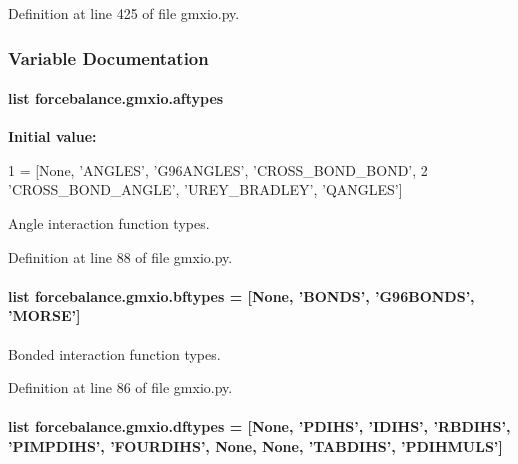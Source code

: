 Definition at line 425 of file gmxio.\-py.



\subsubsection{Variable Documentation}
\hypertarget{namespaceforcebalance_1_1gmxio_aef89ff391902f81feb14e28ec301296c}{
\paragraph[{aftypes}]{\setlength{\rightskip}{0pt plus 5cm}list forcebalance.\-gmxio.\-aftypes}}\label{namespaceforcebalance_1_1gmxio_aef89ff391902f81feb14e28ec301296c}
{\bfseries Initial value\-:}
\begin{DoxyCode}
1 = [\textcolor{keywordtype}{None}, \textcolor{stringliteral}{'ANGLES'}, \textcolor{stringliteral}{'G96ANGLES'}, \textcolor{stringliteral}{'CROSS\_BOND\_BOND'},
2            \textcolor{stringliteral}{'CROSS\_BOND\_ANGLE'}, \textcolor{stringliteral}{'UREY\_BRADLEY'}, \textcolor{stringliteral}{'QANGLES'}]
\end{DoxyCode}


Angle interaction function types. 



Definition at line 88 of file gmxio.\-py.

\hypertarget{namespaceforcebalance_1_1gmxio_a49a34b85d405c9286ceec1e6f088069f}{
\paragraph[{bftypes}]{\setlength{\rightskip}{0pt plus 5cm}list forcebalance.\-gmxio.\-bftypes = \mbox{[}None, 'B\-O\-N\-D\-S', 'G96\-B\-O\-N\-D\-S', 'M\-O\-R\-S\-E'\mbox{]}}}\label{namespaceforcebalance_1_1gmxio_a49a34b85d405c9286ceec1e6f088069f}


Bonded interaction function types. 



Definition at line 86 of file gmxio.\-py.

\hypertarget{namespaceforcebalance_1_1gmxio_acd9fed3887161c6386506563fd4f3534}{
\paragraph[{dftypes}]{\setlength{\rightskip}{0pt plus 5cm}list forcebalance.\-gmxio.\-dftypes = \mbox{[}None, 'P\-D\-I\-H\-S', 'I\-D\-I\-H\-S', 'R\-B\-D\-I\-H\-S', 'P\-I\-M\-P\-D\-I\-H\-S', 'F\-O\-U\-R\-D\-I\-H\-S', None, None, 'T\-A\-B\-D\-I\-H\-S', 'P\-D\-I\-H\-M\-U\-L\-S'\mbox{]}}}\label{namespaceforcebalance_1_1gmxio_acd9fed3887161c6386506563fd4f3534}


